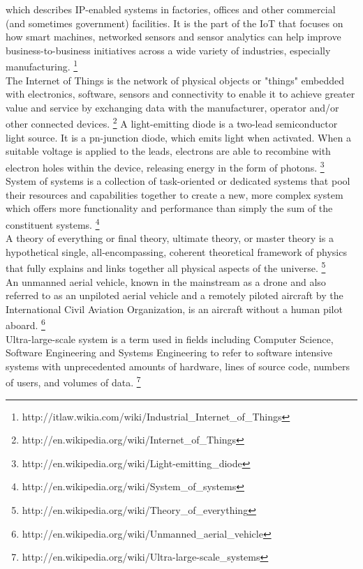 \begin{acronym}
		which describes IP-enabled systems in factories, offices and other
		commercial (and sometimes government) facilities. It is the part of the
		\acs{IoT} that focuses on how smart machines, networked sensors and
		sensor analytics can help improve business-to-business initiatives
		across a wide variety of industries, especially manufacturing.
		\footnote{http://itlaw.wikia.com/wiki/Industrial\_Internet\_of\_Things}
	\\
		The Internet of Things is the network of physical objects or "things"
		embedded with electronics, software, sensors and connectivity to enable
		it to achieve greater value and service by exchanging data with the
		manufacturer, operator and/or other connected devices.
		\footnote{http://en.wikipedia.org/wiki/Internet\_of\_Things}
		A light-emitting diode is a two-lead semiconductor light source. It is
		a pn-junction diode, which emits light when activated. When a suitable
		voltage is applied to the leads, electrons are able to recombine with
		electron holes within the device, releasing energy in the form of
		photons.
		\footnote{http://en.wikipedia.org/wiki/Light-emitting\_diode}
	\\
		System of systems is a collection of task-oriented or dedicated systems
		that pool their resources and capabilities together to create a new,
		more complex system which offers more functionality and performance
		than simply the sum of the constituent systems.
		\footnote{http://en.wikipedia.org/wiki/System\_of\_systems}
	\\
		A theory of everything or final theory, ultimate theory, or master
		theory is a hypothetical single, all-encompassing, coherent theoretical
		framework of physics that fully explains and links together all
		physical aspects of the universe.
		\footnote{http://en.wikipedia.org/wiki/Theory\_of\_everything}
	\\
		An unmanned aerial vehicle, known in the mainstream as a drone and also
		referred to as an unpiloted aerial vehicle and a remotely piloted
		aircraft by the International Civil Aviation Organization, is an
		aircraft without a human pilot aboard.
		\footnote{http://en.wikipedia.org/wiki/Unmanned\_aerial\_vehicle}
	\\
		Ultra-large-scale system is a term used in fields including Computer
		Science, Software Engineering and Systems Engineering to refer to
		software intensive systems with unprecedented amounts of hardware,
		lines of source code, numbers of users, and volumes of data.
		\footnote{http://en.wikipedia.org/wiki/Ultra-large-scale\_systems}
\end{acronym}